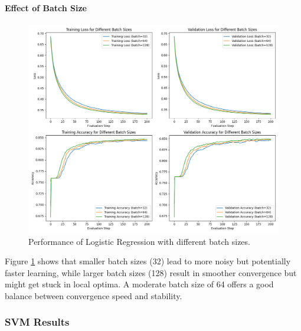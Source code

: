 \documentclass[journal, a4paper]{IEEEtran}
\begin{document}
\paragraph{Effect of Batch Size}
\begin{figure}[htbp]
\centering
\includegraphics[width=\linewidth]{logistic_regression_batch_sizes.png}
\caption{Performance of Logistic Regression with different batch sizes.}
\label{fig:lr_batch}
\end{figure}

Figure \ref{fig:lr_batch} shows that smaller batch sizes (32) lead to more noisy but potentially faster learning, while larger batch sizes (128) result in smoother convergence but might get stuck in local optima. A moderate batch size of 64 offers a good balance between convergence speed and stability.

\subsubsection{SVM Results}
\end{document}
